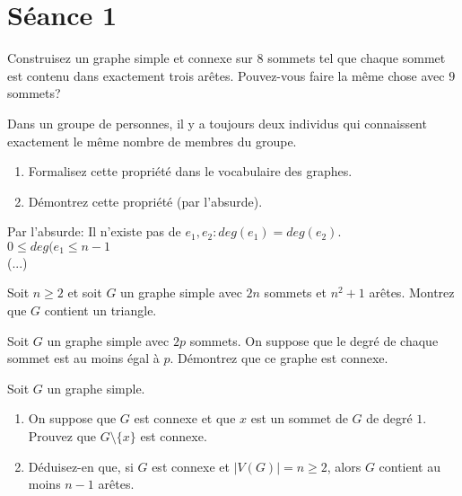
\section{Séance 1}

\begin{exo}
Construisez un graphe simple et connexe sur $8$ sommets tel que chaque sommet est contenu dans exactement trois ar\^etes. Pouvez-vous faire la m\^eme chose avec $9$ sommets?
\end{exo}

\begin{exo}
Dans un groupe de personnes, il y a toujours deux individus qui connaissent exactement le m\^eme nombre de membres du groupe.
\begin{enumerate}
\item Formalisez cette propri\'et\'e dans le vocabulaire des graphes.
\item D\'emontrez cette propri\'et\'e (par l'absurde).
\end{enumerate}
\end{exo}

Par l'absurde: Il n'existe pas de $e_{1}, e_{2}: deg(e_{1}) = deg(e_{2})$. \\

$0 \leq deg(e_{1} \leq n-1$\\

(...)

\begin{exo}
Soit $n\geq 2$ et soit $G$ un graphe simple avec $2n$ sommets et $n^2+1$ ar\^etes. Montrez que $G$ contient un triangle.
\end{exo}

\begin{exo}
Soit $G$ un graphe simple avec $2p$ sommets. On suppose que le degr\'e de chaque sommet est au moins \'egal \`a $p$. D\'emontrez que ce graphe est connexe.
\end{exo}

\begin{exo}
Soit $G$ un graphe simple.
\begin{enumerate}
\item On suppose que $G$ est connexe et que $x$ est un sommet de $G$ de degr\'e $1$. Prouvez que $G\setminus\{x\}$ est connexe.
\item D\'eduisez-en que, si $G$ est connexe et $|V(G)|=n\geq 2$, alors $G$ contient au moins $n-1$ ar\^etes.
\end{enumerate}
\end{exo}

